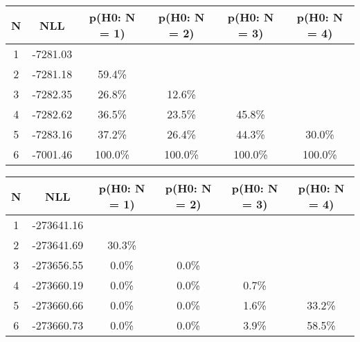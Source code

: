 \begin{table}[htb]
	\begin{center}
{\footnotesize\renewcommand{\arraystretch}{1.4}
		\begin{tabular}{cc||cccc}
			N & NLL & p(H0: N = 1) & p(H0: N = 2) & p(H0: N = 3) & p(H0: N = 4)\\ 
		\hline
1 & -7281.03 & & & & \\
2 & -7281.18 & 59.4\% & & & \\
3 & -7282.35 & 26.8\% & 12.6\% & & \\
4 & -7282.62 & 36.5\% & 23.5\% & 45.8\% & \\
5 & -7283.16 & 37.2\% & 26.4\% & 44.3\% & 30.0\% \\
6 & -7001.46 & 100.0\% & 100.0\% & 100.0\% & 100.0\% \\
	\end{tabular}
		\label{tab:lab}
	}
	\end{center}\end{table}

\begin{table}[htb]
	\begin{center}
{\footnotesize\renewcommand{\arraystretch}{1.4}
		\begin{tabular}{cc||cccc}
			N & NLL & p(H0: N = 1) & p(H0: N = 2) & p(H0: N = 3) & p(H0: N = 4)\\ 
		\hline
1 & -273641.16 & & & & \\
2 & -273641.69 & 30.3\% & & & \\
3 & -273656.55 & 0.0\% & 0.0\% & & \\
4 & -273660.19 & 0.0\% & 0.0\% & 0.7\% & \\
5 & -273660.66 & 0.0\% & 0.0\% & 1.6\% & 33.2\% \\
6 & -273660.73 & 0.0\% & 0.0\% & 3.9\% & 58.5\% \\
	\end{tabular}
		\label{tab:lab}
	}
	\end{center}\end{table}

